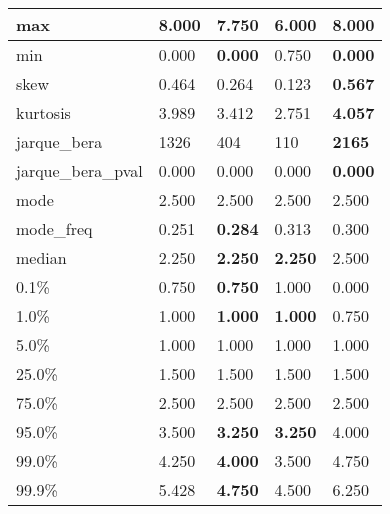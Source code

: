 \begin{table}[H]
\begin{tabular}{|l|m{10em}|m{10em}|m{10em}|m{10em}|}
\hline max & 8.000 & 7.750 & \cellcolor[rgb]{0.9, 0.54, 0.52} 6.000 & \bfseries 8.000 \\
\hline min & 0.000 & \bfseries 0.000 & \cellcolor[rgb]{0.9, 0.54, 0.52} 0.750 & \bfseries 0.000 \\
\hline skew & 0.464 & 0.264 & \cellcolor[rgb]{0.9, 0.54, 0.52} 0.123 & \bfseries 0.567 \\
\hline kurtosis & 3.989 & 3.412 & \cellcolor[rgb]{0.9, 0.54, 0.52} 2.751 & \bfseries 4.057 \\
\hline jarque\_bera & 1326 & 404 & \cellcolor[rgb]{0.9, 0.54, 0.52} 110 & \bfseries 2165 \\
\hline jarque\_bera\_pval & 0.000 & 0.000 & \cellcolor[rgb]{0.9, 0.54, 0.52} 0.000 & \bfseries 0.000 \\
\hline mode & 2.500 & 2.500 & 2.500 & 2.500 \\
\hline mode\_freq & 0.251 & \bfseries 0.284 & \cellcolor[rgb]{0.9, 0.54, 0.52} 0.313 & 0.300 \\
\hline median & 2.250 & \bfseries 2.250 & \bfseries 2.250 & \cellcolor[rgb]{0.9, 0.54, 0.52} 2.500 \\
\hline 0.1\% & 0.750 & \bfseries 0.750 & 1.000 & \cellcolor[rgb]{0.9, 0.54, 0.52} 0.000 \\
\hline 1.0\% & 1.000 & \bfseries 1.000 & \bfseries 1.000 & \cellcolor[rgb]{0.9, 0.54, 0.52} 0.750 \\
\hline 5.0\% & 1.000 & 1.000 & 1.000 & 1.000 \\
\hline 25.0\% & 1.500 & 1.500 & 1.500 & 1.500 \\
\hline 75.0\% & 2.500 & 2.500 & 2.500 & 2.500 \\
\hline 95.0\% & 3.500 & \bfseries 3.250 & \bfseries 3.250 & \cellcolor[rgb]{0.9, 0.54, 0.52} 4.000 \\
\hline 99.0\% & 4.250 & \bfseries 4.000 & \cellcolor[rgb]{0.9, 0.54, 0.52} 3.500 & 4.750 \\
\hline 99.9\% & 5.428 & \bfseries 4.750 & \cellcolor[rgb]{0.9, 0.54, 0.52} 4.500 & 6.250 \\
\hline
\end{tabular}
\end{table}
